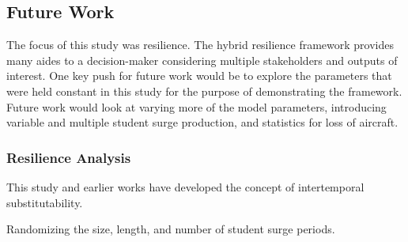 \documentclass[preprint,12pt]{elsarticle}
\begin{document}
\subsection{Future Work}

The focus of this study was resilience. The hybrid resilience
framework provides many aides to a decision-maker considering multiple
stakeholders and outputs of interest.
One key push for future work would be to explore the parameters that
were held constant in this study for the purpose of demonstrating the
framework. Future work would look at varying more of the model parameters,
introducing variable and multiple student surge production, and
statistics for loss of aircraft. 

\subsubsection{Resilience Analysis}
This study and earlier works have developed the concept of
intertemporal substitutability. 

Randomizing the size, length, and number of student surge periods. 




\clearpage








\end{document}
